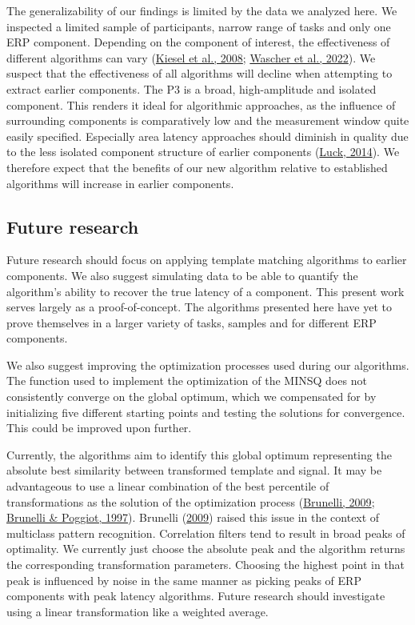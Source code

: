 \documentclass[
  man]{apa7}
\begin{document}
The generalizability of our findings is limited by the data we analyzed here. We inspected a limited sample of participants, narrow range of tasks and only one ERP component. Depending on the component of interest, the effectiveness of different algorithms can vary (\protect\hyperlink{ref-kiesel2008measurement}{Kiesel et al., 2008}; \protect\hyperlink{ref-wascher2022mental}{Wascher et al., 2022}). We suspect that the effectiveness of all algorithms will decline when attempting to extract earlier components. The P3 is a broad, high-amplitude and isolated component. This renders it ideal for algorithmic approaches, as the influence of surrounding components is comparatively low and the measurement window quite easily specified. Especially area latency approaches should diminish in quality due to the less isolated component structure of earlier components (\protect\hyperlink{ref-luck2014introduction}{Luck, 2014}). We therefore expect that the benefits of our new algorithm relative to established algorithms will increase in earlier components.

\hypertarget{future-research}{%
\subsection{Future research}\label{future-research}}

Future research should focus on applying template matching algorithms to earlier components. We also suggest simulating data to be able to quantify the algorithm's ability to recover the true latency of a component. This present work serves largely as a proof-of-concept. The algorithms presented here have yet to prove themselves in a larger variety of tasks, samples and for different ERP components.

We also suggest improving the optimization processes used during our algorithms. The function used to implement the optimization of the MINSQ does not consistently converge on the global optimum, which we compensated for by initializing five different starting points and testing the solutions for convergence. This could be improved upon further.

Currently, the algorithms aim to identify this global optimum representing the absolute best similarity between transformed template and signal. It may be advantageous to use a linear combination of the best percentile of transformations as the solution of the optimization process (\protect\hyperlink{ref-brunelli2009template}{Brunelli, 2009}; \protect\hyperlink{ref-brunelli1997template}{Brunelli \& Poggiot, 1997}). Brunelli (\protect\hyperlink{ref-brunelli2009template}{2009}) raised this issue in the context of multiclass pattern recognition. Correlation filters tend to result in broad peaks of optimality. We currently just choose the absolute peak and the algorithm returns the corresponding transformation parameters. Choosing the highest point in that peak is influenced by noise in the same manner as picking peaks of ERP components with peak latency algorithms. Future research should investigate using a linear transformation like a weighted average.
\end{document}
